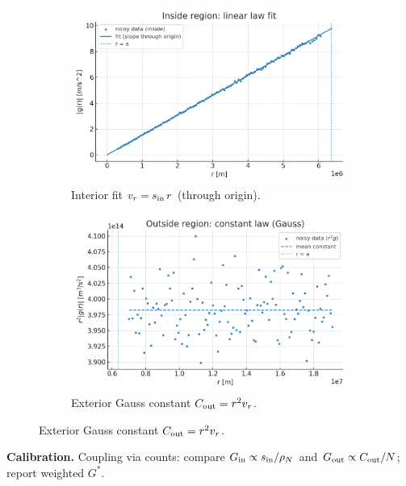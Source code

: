 \documentclass[12pt,a4paper,oneside]{scrreprt}
\def\;{}%
\begin{document}
\begin{figure}[htbp]
  \vspace{0.6em}
  \begin{subfigure}[t]{0.49\linewidth}
    \includegraphics[width=\linewidth]{gravity_inside_fit.png}
    \caption{Interior fit $\;v_r=s_{\rm in}\,r\;$ (through origin).}
    \label{fig:grav:inside}
  \end{subfigure}\hfill
  \begin{subfigure}[t]{0.49\linewidth}
    \includegraphics[width=\linewidth]{gravity_outside_constant.png}
    \caption{Exterior Gauss constant $C_{\rm out}=r^2 v_r$.}
    \label{fig:grav:cout}
  \end{subfigure}
\end{figure}

\noindent\textbf{Calibration.} Coupling via counts: compare $G_{\rm in}\propto s_{\rm in}/\rho_N$ and $G_{\rm out}\propto C_{\rm out}/N$; report weighted $G^*$.
\end{document}

